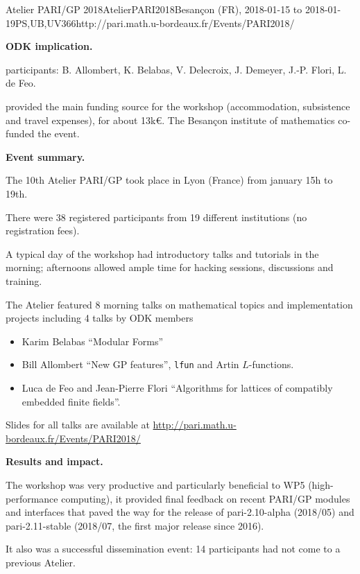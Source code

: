 \begin{event}{Atelier PARI/GP 2018}{AtelierPARI2018}{Besan\c{c}on (FR),
2018-01-15 to 2018-01-19}{PS,UB,UV}{36}{6}{http://pari.math.u-bordeaux.fr/Events/PARI2018/}


\textbf{ODK implication.} 

\ODK participants: B. Allombert, K. Belabas, V. Delecroix, J. Demeyer,
J.-P. Flori, L. de Feo.

\ODK provided the main funding source for the workshop (accommodation,
subsistence and travel expenses), for about 13k\euro. The Besan\c{c}on
institute of mathematics co-funded the event.

\textbf{Event summary.} 

The 10th Atelier PARI/GP took place in Lyon (France) from january
15h to 19th.

There were 38 registered participants from 19 different institutions
(no registration fees).

A typical day of the workshop had introductory talks and tutorials
in the morning; afternoons allowed ample time for hacking sessions,
discussions and training.

The Atelier featured 8 morning talks on mathematical topics and
implementation projects including 4 talks by ODK members
\begin{itemize}
\item Karim Belabas ``Modular Forms''
\item Bill Allombert ``New GP features'', \texttt{lfun} and Artin
  $L$-functions.
\item Luca de Feo and Jean-Pierre Flori ``Algorithms for lattices of
  compatibly embedded finite fields''.
\end{itemize}

Slides for all talks are available at
\url{http://pari.math.u-bordeaux.fr/Events/PARI2018/}

\textbf{Results and impact.} 

The workshop was very productive and particularly beneficial to WP5
(high-performance computing), it provided final feedback on recent PARI/GP
  modules and interfaces that paved the way for the release of
  pari-2.10-alpha (2018/05) and pari-2.11-stable (2018/07, the first major
  release since 2016).
  
It also was a successful dissemination event: 14 participants had not come to
  a previous Atelier.
\end{event}
